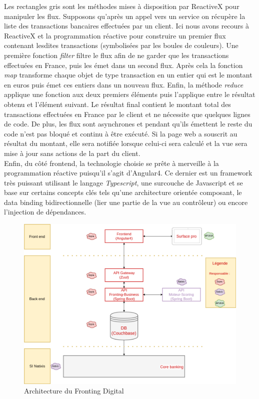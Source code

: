 	Les rectangles gris sont les méthodes mises à disposition par ReactiveX pour manipuler les flux. Supposons qu'après un appel vers un service on récupère la liste des transactions bancaires effectuées par un client. Ici nous avons recours à ReactiveX et la programmation réactive pour construire un premier flux contenant lesdites transactions (symbolisées par les boules de couleurs). Une première fonction \textit{filter} filtre le flux afin de ne garder que les transactions effectuées en France, puis les émet dans un second flux. Après cela la fonction \textit{map} transforme chaque objet de type transaction en un entier qui est le montant en euros puis émet ces entiers dans un nouveau flux. Enfin, la méthode \textit{reduce} applique une fonction aux deux premiers éléments puis l'applique entre le résultat obtenu et l'élément suivant. Le résultat final contient le montant total des transactions effectuées en France par le client et ne nécessite que quelques lignes de code. De plus, les flux sont asynchrones et pendant qu'ils émettent le reste du code n'est pas bloqué et continu à être exécuté. Si la page web a souscrit au résultat du montant, elle sera notifiée lorsque celui-ci sera calculé et la vue sera mise à jour sans actions de la part du client. \\

	Enfin, du côté frontend, la technologie choisie se prête à merveille à la programmation réactive puisqu'il s'agit d'Angular4. Ce dernier est un framework très puissant utilisant le langage \textit{Typescript}, une surcouche de Javascript et se base sur certains concepts clés tels qu'une architecture orientée composant, le data binding bidirectionnelle (lier une partie de la vue au contrôleur) ou encore l'injection de dépendances.

\begin{figure}[h!]
	\includegraphics[scale=0.50]{images/travailBP1818/architecture/archiFonc.png}
	\centering
	\caption{Architecture du Fronting Digital}
	\label{archiFoncBP1818}
\end{figure}

